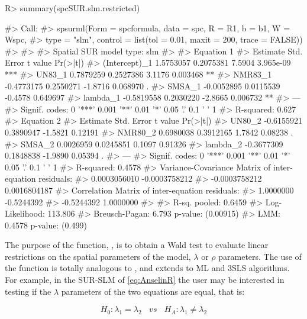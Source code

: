 \documentclass[article]{jss}
\begin{document}
\begin{CodeChunk}

\begin{CodeInput}
R> summary(spcSUR.slm.restricted)
\end{CodeInput}

\begin{CodeOutput}
#> Call:
#> spsurml(Form = spcformula, data = spc, R = R1, b = b1, W = Wspc, 
#>     type = "slm", control = list(tol = 0.01, maxit = 200, trace = FALSE))
#> 
#>  
#> Spatial SUR model type:  slm 
#> 
#> Equation  1 
#>                 Estimate Std. Error t value  Pr(>|t|)    
#> (Intercept)_1  1.5753057  0.2075381  7.5904 3.965e-09 ***
#> UN83_1         0.7879259  0.2527386  3.1176  0.003468 ** 
#> NMR83_1       -0.4773175  0.2550271 -1.8716  0.068970 .  
#> SMSA_1        -0.0052895  0.0115539 -0.4578  0.649697    
#> lambda_1      -0.5819558  0.2030220 -2.8665  0.006732 ** 
#> ---
#> Signif. codes:  0 '***' 0.001 '**' 0.01 '*' 0.05 '.' 0.1 ' ' 1
#> R-squared: 0.627 
#>   Equation  2 
#>            Estimate Std. Error t value Pr(>|t|)  
#> UN80_2   -0.6155921  0.3890947 -1.5821  0.12191  
#> NMR80_2   0.6980038  0.3912165  1.7842  0.08238 .
#> SMSA_2    0.0026959  0.0245851  0.1097  0.91326  
#> lambda_2 -0.3677309  0.1848838 -1.9890  0.05394 .
#> ---
#> Signif. codes:  0 '***' 0.001 '**' 0.01 '*' 0.05 '.' 0.1 ' ' 1
#> R-squared: 0.4578 
#>   Variance-Covariance Matrix of inter-equation residuals:                            
#>   0.0003056010 -0.0003758212
#>  -0.0003758212  0.0016804187
#> Correlation Matrix of inter-equation residuals:                      
#>   1.0000000 -0.5244392
#>  -0.5244392  1.0000000
#> 
#>  R-sq. pooled: 0.6459 
#>  Log-Likelihood:  113.806
#>  Breusch-Pagan: 6.793  p-value: (0.00915) 
#>  LMM: 0.4578  p-value: (0.499)
\end{CodeOutput}
\end{CodeChunk}

The purpose of the function, , is to obtain a Wald test to evaluate linear restrictions on the spatial parameters of the model, \(\lambda\) or \(\rho\) parameters. The use of the function is totally analogous to , and extends to ML and 3SLS algorithms. For example, in the SUR-SLM of \eqref{eq:AnselinR} the user may be interested in testing if the \(\lambda\) parameters of the two equations are equal, that is:

\begin{equation}
H_0: \lambda_1=\lambda_2 \ \ \ \ vs \ \ \ \ H_A: \lambda_1 \neq \lambda_2
\label{eq:examlindelta}
\end{equation}
\end{document}
